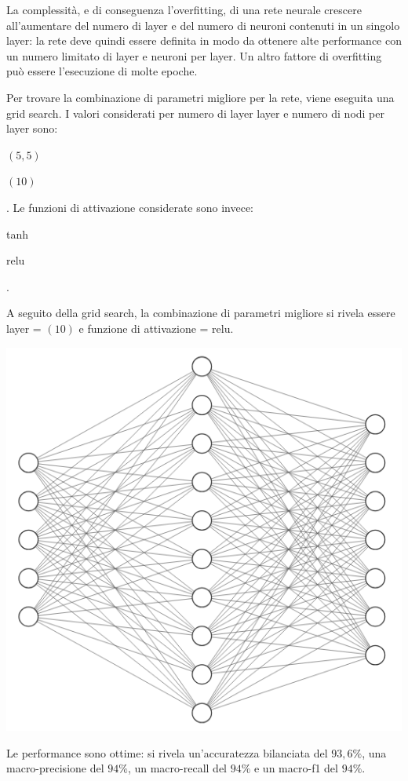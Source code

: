La complessità, e di conseguenza l'overfitting, di una rete neurale crescere
all'aumentare del numero di layer e del numero di neuroni contenuti in un
singolo layer: la rete deve quindi
essere definita in modo da ottenere alte performance con un numero limitato
di layer e neuroni per layer.
Un altro fattore di overfitting può essere l'esecuzione di molte epoche.

Per trovare la combinazione di parametri migliore per la rete, viene eseguita 
una grid search. 
I valori considerati per numero di layer layer e numero di nodi per layer sono:
\begin{itemize*}
    \item $(5, 5)$
    \item $(10)$
\end{itemize*}.
Le funzioni di attivazione considerate sono invece: \begin{itemize*}
    \item tanh
    \item relu
\end{itemize*}.

A seguito della grid search, la combinazione di parametri migliore si rivela essere 
layer = $(10)$ e funzione di attivazione = relu.

\begin{Figure}
    \centering
    \includegraphics[width=0.75\linewidth]{img/mlp.png}
\end{Figure}

Le performance sono ottime: si rivela un'accuratezza bilanciata del $93,6\%$, una macro-precisione 
del $94\%$, un macro-recall del $94\%$ e un macro-f1 del $94\%$.


